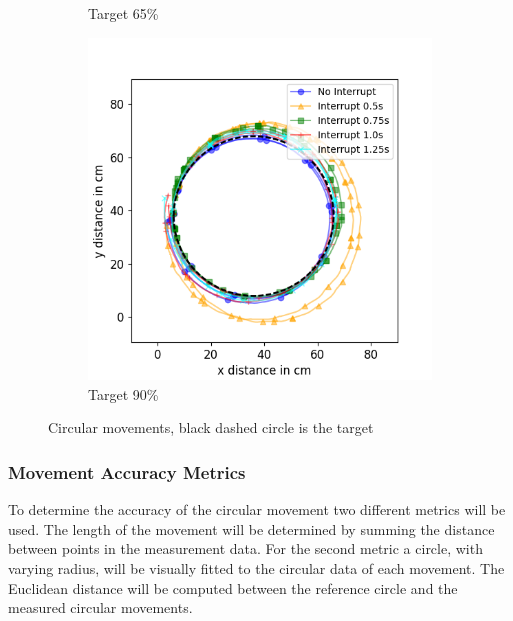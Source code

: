 \begin{figure}[h!]
\begin{subfigure}[b]{0.5\textwidth}
		\caption{Target 65\%}
		\label{fig:circ_exp2}
	\end{subfigure}
	\begin{subfigure}[b]{0.5\textwidth}
		\includegraphics[width=\textwidth]{pics/circle_90.png}
		\caption{Target 90\%}
		\label{fig:circ_exp3}
	\end{subfigure}
	\caption{Circular movements, black dashed circle is the target}
	\label{fig:circular_movements}
\end{figure}

\subsubsection{Movement Accuracy Metrics}

To determine the accuracy of the circular movement two different metrics will be used.
The length of the movement will be determined by summing the distance between points in the measurement data.
For the second metric a circle, with varying radius, will be visually fitted to the circular data of each movement.
The Euclidean distance will be computed between the reference circle and the measured circular movements.


